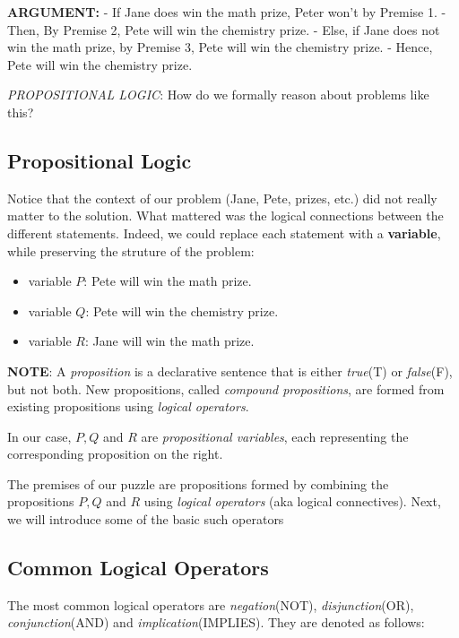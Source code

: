 \documentclass[11pt]{article}
\providecommand{\tightlist}{%
      \setlength{\itemsep}{0pt}\setlength{\parskip}{0pt}}
\begin{document}
\textbf{ARGUMENT:} - If Jane does win the math prize, Peter won't by
Premise 1. -Then, By Premise 2, Pete will win the chemistry prize. -
Else, if Jane does not win the math prize, by Premise 3, Pete will win
the chemistry prize. - Hence, Pete will win the chemistry prize.

    \emph{PROPOSITIONAL LOGIC}: How do we formally reason about problems
like this?

    \subsection{Propositional Logic}\label{propositional-logic}

Notice that the context of our problem (Jane, Pete, prizes, etc.) did
not really matter to the solution. What mattered was the logical
connections between the different statements. Indeed, we could replace
each statement with a \textbf{variable}, while preserving the struture
of the problem:

\begin{itemize}
\tightlist
\item
  variable \(P\): Pete will win the math prize.
\item
  variable \(Q\): Pete will win the chemistry prize.
\item
  variable \(R\): Jane will win the math prize.
\end{itemize}

    \textbf{NOTE}: A \emph{proposition} is a declarative sentence that is
either \emph{true}(T) or \emph{false}(F), but not both. New
propositions, called \emph{compound propositions}, are formed from
existing propositions using \emph{logical operators}.

In our case, \(P,Q\) and \(R\) are \emph{propositional variables}, each
representing the corresponding proposition on the right.

    The premises of our puzzle are propositions formed by combining the
propositions \(P,Q\) and \(R\) using \emph{logical operators} (aka
logical connectives). Next, we will introduce some of the basic such
operators

    \subsection{Common Logical Operators}\label{common-logical-operators}

The most common logical operators are \emph{negation}(NOT),
\emph{disjunction}(OR), \emph{conjunction}(AND) and
\emph{implication}(IMPLIES). They are denoted as follows:
\end{document}
